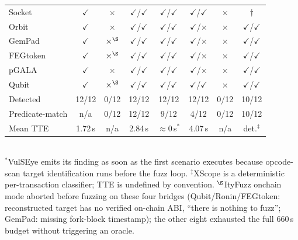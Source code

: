 \documentclass[journal]{IEEEtran}
\begin{document}
\begin{table}[h!]
{\begin{tabular}{@{}lccccccc@{}}
Socket          & $\checkmark$ & $\times$ & $\checkmark$/$\checkmark$ & $\checkmark$/$\checkmark$ & $\checkmark$/$\checkmark$ & $\times$ & $\dagger$ \\
Orbit           & $\checkmark$ & $\times$ & $\checkmark$/$\checkmark$ & $\checkmark$/$\checkmark$ & $\checkmark$/$\times$ & $\times$ & $\checkmark$/$\checkmark$ \\
GemPad          & $\checkmark$ & $\times^{\S}$ & $\checkmark$/$\checkmark$ & $\checkmark$/$\checkmark$ & $\checkmark$/$\times$ & $\times$ & $\checkmark$/$\checkmark$ \\
FEGtoken        & $\checkmark$ & $\times^{\S}$ & $\checkmark$/$\checkmark$ & $\checkmark$/$\checkmark$ & $\checkmark$/$\times$ & $\times$ & $\checkmark$/$\checkmark$ \\
pGALA           & $\checkmark$ & $\times$ & $\checkmark$/$\checkmark$ & $\checkmark$/$\checkmark$ & $\checkmark$/$\times$ & $\times$ & $\checkmark$/$\checkmark$ \\
Qubit           & $\checkmark$ & $\times^{\S}$ & $\checkmark$/$\checkmark$ & $\checkmark$/$\checkmark$ & $\checkmark$/$\checkmark$ & $\times$ & $\checkmark$/$\checkmark$ \\
\midrule
Detected        & 12/12 & 0/12 & 12/12 & 12/12 & 12/12 & 0/12 & 10/12 \\
Predicate-match & n/a & 0/12 & 12/12 & 9/12 & 4/12 & 0/12 & 10/12 \\
Mean TTE        & 1.72\,s & n/a & 2.84\,s & $\approx$0\,s$^{\ast}$ & 4.07\,s & n/a & det.$^{\ddagger}$ \\
\bottomrule
\end{tabular}
}
\\[0.4em]
{\footnotesize $^{\ast}$VulSEye emits its finding as soon as the first scenario executes because opcode-scan target identification runs before the fuzz loop. $^{\ddagger}$XScope is a deterministic per-transaction classifier; TTE is undefined by convention. $^{\S}$ItyFuzz onchain mode aborted before fuzzing on these four bridges (Qubit/Ronin/FEGtoken: reconstructed target has no verified on-chain ABI, ``there is nothing to fuzz''; GemPad: missing fork-block timestamp); the other eight exhausted the full 660\,s budget without triggering an oracle.}
\end{table}
\end{document}
